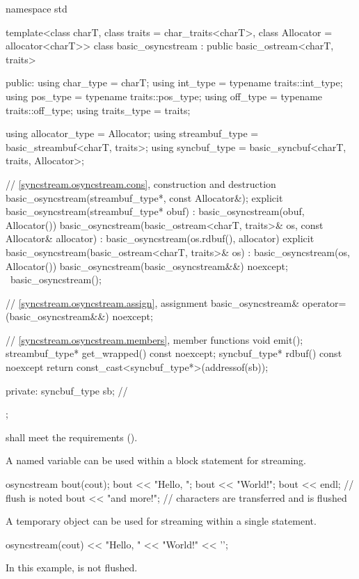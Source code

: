 %
\begin{codeblock}
namespace std {
  template<class charT, class traits = char_traits<charT>, class Allocator = allocator<charT>>
  class basic_osyncstream : public basic_ostream<charT, traits> {
  public:
    using char_type   = charT;
    using int_type    = typename traits::int_type;
    using pos_type    = typename traits::pos_type;
    using off_type    = typename traits::off_type;
    using traits_type = traits;

    using allocator_type = Allocator;
    using streambuf_type = basic_streambuf<charT, traits>;
    using syncbuf_type   = basic_syncbuf<charT, traits, Allocator>;

    // \ref{syncstream.osyncstream.cons}, construction and destruction
    basic_osyncstream(streambuf_type*, const Allocator&);
    explicit basic_osyncstream(streambuf_type* obuf)
      : basic_osyncstream(obuf, Allocator()) {}
    basic_osyncstream(basic_ostream<charT, traits>& os, const Allocator& allocator)
      : basic_osyncstream(os.rdbuf(), allocator) {}
    explicit basic_osyncstream(basic_ostream<charT, traits>& os)
      : basic_osyncstream(os, Allocator()) {}
    basic_osyncstream(basic_osyncstream&&) noexcept;
    ~basic_osyncstream();

    // \ref{syncstream.osyncstream.assign}, assignment
    basic_osyncstream& operator=(basic_osyncstream&&) noexcept;

    // \ref{syncstream.osyncstream.members}, member functions
    void emit();
    streambuf_type* get_wrapped() const noexcept;
    syncbuf_type* rdbuf() const noexcept { return const_cast<syncbuf_type*>(addressof(sb)); }

  private:
    syncbuf_type sb;    // \expos
  };
}
\end{codeblock}

\pnum
{} shall meet the  requirements
().

\pnum
\begin{example}
A named variable can be used within a block statement for streaming.
\begin{codeblock}
{
  osyncstream bout(cout);
  bout << "Hello, ";
  bout << "World!";
  bout << endl; // flush is noted
  bout << "and more!\n";
}   // characters are transferred and  is flushed
\end{codeblock}
\end{example}

\pnum
\begin{example}
A temporary object can be used for streaming within a single statement.
\begin{codeblock}
osyncstream(cout) << "Hello, " << "World!" << '\n';
\end{codeblock}
In this example,  is not flushed.
\end{example}

